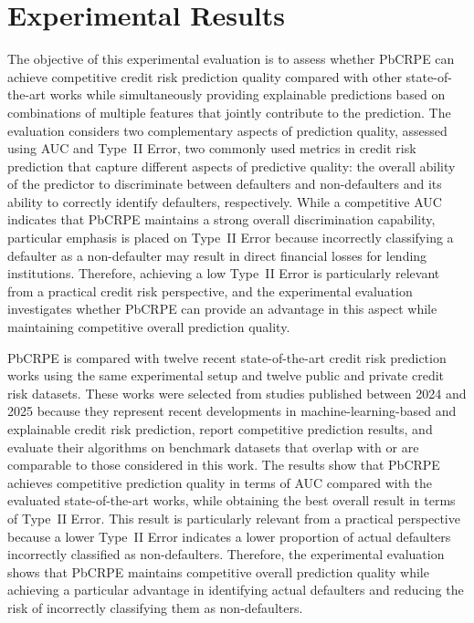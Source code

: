 {\color{blue}
\section{Experimental Results}\label{sec:experimental}
The objective of this experimental evaluation is to assess whether PbCRPE can achieve competitive credit risk prediction quality compared with other state-of-the-art works while simultaneously providing explainable predictions based on combinations of multiple features that jointly contribute to the prediction. The evaluation considers two complementary aspects of prediction quality, assessed using AUC and Type~II Error, two commonly used metrics in credit risk prediction that capture different aspects of predictive quality: the overall ability of the predictor to discriminate between defaulters and non-defaulters and its ability to correctly identify defaulters, respectively. While a competitive AUC indicates that PbCRPE maintains a strong overall discrimination capability, particular emphasis is placed on Type~II Error because incorrectly classifying a defaulter as a non-defaulter may result in direct financial losses for lending institutions. Therefore, achieving a low Type~II Error is particularly relevant from a practical credit risk perspective, and the experimental evaluation investigates whether PbCRPE can provide an advantage in this aspect while maintaining competitive overall prediction quality.\newline

PbCRPE is compared with twelve recent state-of-the-art credit risk prediction works using the same experimental setup and twelve public and private credit risk datasets. These works were selected from studies published between 2024 and 2025 because they represent recent developments in machine-learning-based and explainable credit risk prediction, report competitive prediction results, and evaluate their algorithms on benchmark datasets that overlap with or are comparable to those considered in this work. The results show that PbCRPE achieves competitive prediction quality in terms of AUC compared with the evaluated state-of-the-art works, while obtaining the best overall result in terms of Type~II Error. This result is particularly relevant from a practical perspective because a lower Type~II Error indicates a lower proportion of actual defaulters incorrectly classified as non-defaulters. Therefore, the experimental evaluation shows that PbCRPE maintains competitive overall prediction quality while achieving a particular advantage in identifying actual defaulters and reducing the risk of incorrectly classifying them as non-defaulters.

}

